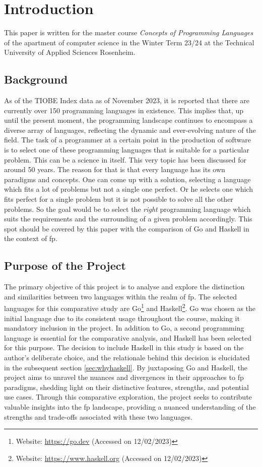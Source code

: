 \chapter{Introduction}\label{chap:introduction}
This paper is written for the master course \textit{Concepts of Programming Languages} of the apartment of computer science in the Winter Term 23/24 at the Technical University of Applied Sciences Rosenheim.
    \section{Background}\label{sec:background}
As of the TIOBE Index data as of November 2023, it is reported that there are currently over 150 programming languages in existence. This implies that, up until the present moment, the programming landscape continues to encompass a diverse array of languages, reflecting the dynamic and ever-evolving nature of the field.\cite{tiobeindex} The task of a programmer at a certain point in the production of software is to select one of these programming languages that is suitable for a particular problem. This can be a science in itself. This very topic has been discussed for around 50 years.\cite{Tharp1982}
The reason for that is that every language has its own paradigms and concepts. One can come up with a solution, selecting a language which fits a lot of problems but not a single one perfect. Or he selects one which fits perfect for a single problem but it is not possible to solve all the other problems.
So the goal would be to select the \textit{right} programming language which suits the requirements and the surrounding of a given problem accordingly.
This spot should be covered by this paper with the comparison of Go and Haskell in the context of \ac{fp}.

    \section{Purpose of the Project}\label{sec:purpose}
    The primary objective of this project is to analyse and explore the distinction and similarities between two languages within the realm of \ac{fp}. The selected languages for this comparative study are Go\footnote{Website: \url{https://go.dev} (Accessed on 12/02/2023)} and Haskell\footnote{Website: \url{https://www.haskell.org} (Accessed on 12/02/2023)}. Go was chosen as the initial language due to its consistent usage throughout the course, making it mandatory inclusion in the project. 
    In addition to Go, a second programming language is essential for the comparative analysis, and Haskell has been selected for this purpose. The decision to include Haskell in this study is based on the author's deliberate choice, and the relationale behind this decision is elucidated in the subsequent section \ref{sec:whyhaskell}. By juxtaposing Go and Haskell, the project aims to unravel the nuances and divergences in their approaches to \ac{fp} paradigms, shedding light on their distinctive features, strengths, and potential use cases. Through this comparative exploration, the project seeks to contribute valuable insights into the \ac{fp} landscape, providing a nuanced understanding of the strengths and trade-offs associated with these two languages.

